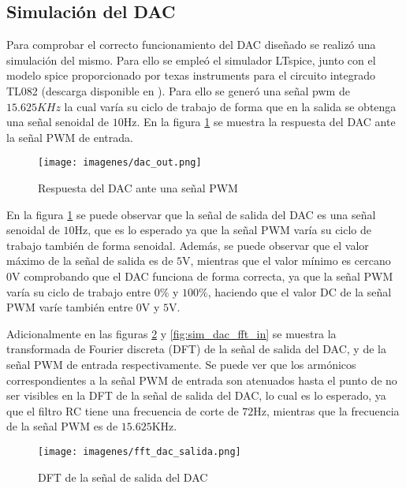     \subsection{Simulación del DAC}

    Para comprobar el correcto funcionamiento del DAC diseñado se realizó una
    simulación del mismo. Para ello se empleó el simulador LTspice, junto con
    el modelo spice proporcionado por texas instruments para el circuito integrado
    TL082 (descarga disponible en \cite{noauthor_tl081_nodate}). Para ello se 
    generó una señal pwm de $15.625KHz$ la cual varía su ciclo de trabajo 
    de forma que en la salida se obtenga una señal senoidal de $10\text{Hz}$. 
    En la figura
    \ref{fig:sim_dac} se muestra la respuesta del DAC ante la señal PWM de entrada.

    \begin{figure}[H]
        \centering
        \texttt{[image: imagenes/dac\_out.png]}
        \caption{Respuesta del DAC ante una señal PWM}
        \label{fig:sim_dac}
    \end{figure}

    En la figura \ref{fig:sim_dac} se puede observar que la señal de salida
    del DAC es una señal senoidal de $10\text{Hz}$, que es lo esperado ya 
    que la señal PWM varía su ciclo de trabajo también de forma senoidal.
    Además, se puede observar que el valor máximo de la señal de salida es
    de $5\text{V}$, mientras que el valor mínimo es cercano $0\text{V}$
    comprobando que el DAC funciona de forma correcta, ya que la señal PWM
    varía su ciclo de trabajo entre $0\%$ y $100\%$, haciendo que el valor 
    DC de la señal PWM varíe también entre $0\text{V}$ y $5\text{V}$.

    Adicionalmente en las figuras \ref{fig:sim_dac_fft} y \ref{fig:sim_dac_fft_in}
    se muestra la transformada de Fourier discreta (DFT) de la señal de salida
    del DAC, y de la señal PWM de entrada respectivamente. Se puede ver 
    que los armónicos correspondientes a la señal PWM de entrada son atenuados
    hasta el punto de no ser visibles en la DFT de la señal de salida del
    DAC, lo cual es lo esperado, ya que el filtro RC tiene una frecuencia de corte
    de $72\text{Hz}$, mientras que la frecuencia de la señal PWM es de 
    $15.625\text{KHz}$.

    \begin{figure}[H]
        \centering
        \texttt{[image: imagenes/fft\_dac\_salida.png]}
        \caption{DFT de la señal de salida del DAC}
        \label{fig:sim_dac_fft}
    \end{figure}

